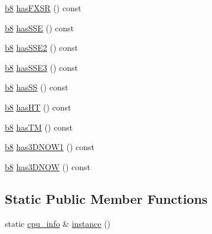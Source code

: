 \begin{DoxyCompactItemize}
\item 
\hyperlink{types_8h_a74eb47b4ab9e428eab7b91b3b877fa6c}{b8} \hyperlink{classcrap_1_1cpu__info_a9049d153b2b6e9e13f48d51821094c55}{has\-F\-X\-S\-R} () const 
\item 
\hyperlink{types_8h_a74eb47b4ab9e428eab7b91b3b877fa6c}{b8} \hyperlink{classcrap_1_1cpu__info_a61254fb7750180993c0769bced300aa1}{has\-S\-S\-E} () const 
\item 
\hyperlink{types_8h_a74eb47b4ab9e428eab7b91b3b877fa6c}{b8} \hyperlink{classcrap_1_1cpu__info_a8a45ee799d25a0f7b3736f65cbc6e152}{has\-S\-S\-E2} () const 
\item 
\hyperlink{types_8h_a74eb47b4ab9e428eab7b91b3b877fa6c}{b8} \hyperlink{classcrap_1_1cpu__info_a897da33ca7c6406fe880ab648e7fa5b2}{has\-S\-S\-E3} () const 
\item 
\hyperlink{types_8h_a74eb47b4ab9e428eab7b91b3b877fa6c}{b8} \hyperlink{classcrap_1_1cpu__info_a7324211ab5f48dedbdd72b3efb521100}{has\-S\-S} () const 
\item 
\hyperlink{types_8h_a74eb47b4ab9e428eab7b91b3b877fa6c}{b8} \hyperlink{classcrap_1_1cpu__info_a7aeaae2ac5faf05cb0b1d893fcf2885c}{has\-H\-T} () const 
\item 
\hyperlink{types_8h_a74eb47b4ab9e428eab7b91b3b877fa6c}{b8} \hyperlink{classcrap_1_1cpu__info_a9d48f8021b83e36f98496457f7a9d678}{has\-T\-M} () const 
\item 
\hyperlink{types_8h_a74eb47b4ab9e428eab7b91b3b877fa6c}{b8} \hyperlink{classcrap_1_1cpu__info_aba9f11c23e521e354cab39e4a49b814b}{has3\-D\-N\-O\-W1} () const 
\item 
\hyperlink{types_8h_a74eb47b4ab9e428eab7b91b3b877fa6c}{b8} \hyperlink{classcrap_1_1cpu__info_af062ef5c3e7f0f8d7deff8d7e529db61}{has3\-D\-N\-O\-W} () const 
\end{DoxyCompactItemize}
\subsection*{Static Public Member Functions}
\begin{DoxyCompactItemize}
\item 
static \hyperlink{classcrap_1_1cpu__info}{cpu\-\_\-info} \& \hyperlink{classcrap_1_1cpu__info_a868c1cb6a45806a1fc326483f7c73c1f}{instance} ()
\end{DoxyCompactItemize}



